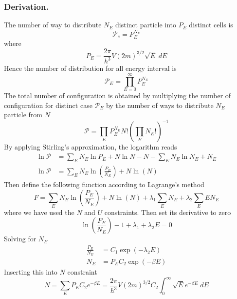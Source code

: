 \documentclass[../../../Main.tex]{subfiles}
\begin{document}
\subsubsection*{Derivation.} The number of way to distribute $N_E$ distinct particle into $P_E$ distinct cells is 
\begin{equation*}
    \mathcal{P}_e=P_E^{N_E}
\end{equation*}
where
\begin{equation*}
    P_E=\frac{2\pi}{h^3}V(2m)^{3/2}\sqrt{E}\;dE
\end{equation*}
Hence the number of distribution for all energy interval is 
\begin{equation*}
    \mathcal{P}_E=\prod_{E=0}^{\infty}P_E^{N_E}
\end{equation*}
The total number of configuration is obtained by multiplying the number of configuration for distinct case $\mathcal{P}_E$ by the number of ways to distribute $N_E$ particle from $N$
\begin{equation*}
    \mathcal{P}=\prod_{E} P_E^{N_E}N!\left(\prod_{E} N_E!\right)^{-1}
\end{equation*}
By applying Stirling's approximation, the logarithm reads
\begin{align*}
    \ln \mathcal{P}&=\sum_E N_E \ln P_E+ N\ln N -N-\sum_E N_E \ln N_E+ N_E\\
    \ln \mathcal{P}&=\sum_E N_E \ln \left(\frac{P_E}{N_E}\right)+ N\ln (N)
\end{align*} 
Then define the following function according to Lagrange's method
\begin{equation*}
    F=\sum_E N_E \ln \left(\frac{P_E}{N_E}\right)+ N\ln (N) +\lambda_1\sum_E N_E +\lambda_2\sum_E EN_E
\end{equation*}
where we have used the $N$ and $U$ constraints. Then set its derivative to zero 
\begin{equation*}
    \ln \left(\frac{P_E}{N_E}\right)-1+\lambda_1+\lambda_2E=0
\end{equation*}
Solving for $N_E$
\begin{align*}
    \frac{P_E }{N_E}&=C_1\exp\left(-\lambda_2E\right)\\
    N_E&=P_E C_2 \exp\left(-\beta E\right)
\end{align*}
Inserting this into $N$ constraint
\begin{equation*}
    N=\sum_E P_E C_2 e^{-\beta E}= \frac{2\pi}{h^3}V(2m)^{3/2} C_2\int_{0}^{\infty} \sqrt{E}e^{-\beta E}\;dE
\end{equation*}
\end{document}
